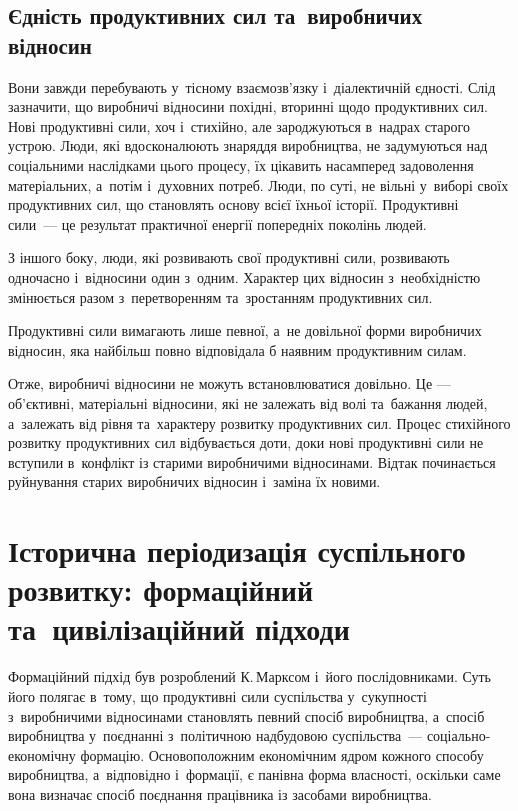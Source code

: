 \documentclass[a5paper,oneside,DIV=12,12pt,headings=small]{scrartcl}
\begin{document}
		\subsection{Єдність продуктивних сил та~виробничих відносин}
			Вони завжди перебувають у~тісному взаємозв'язку і~діалектичній єдності. Слід зазначити, що виробничі відносини похідні, вторинні щодо продуктивних сил. Нові продуктивні сили, хоч і~стихійно, але зароджуються в~надрах старого устрою. Люди, які вдосконалюють знаряддя виробництва, не задумуються над соціальними наслідками цього процесу, їх цікавить насамперед задоволення матеріальних, а~потім і~духовних потреб. Люди, по суті, не вільні у~виборі своїх продуктивних сил, що становлять основу всієї їхньої історії. Продуктивні сили~— це результат практичної енергії попередніх поколінь людей.

			З іншого боку, люди, які розвивають свої продуктивні сили, розвивають одночасно і~відносини один з~одним. Характер цих відносин з~необхідністю змінюється разом з~перетворенням та~зростанням продуктивних сил.

			Продуктивні сили вимагають лише певної, а~не довільної форми виробничих відносин, яка найбільш повно відповідала б наявним продуктивним силам.

			Отже, виробничі відносини не можуть встановлюватися довільно. Це — об'\-єктивні, матеріальні відносини, які не залежать від волі та~бажання людей, а~залежать від рівня та~характеру розвитку продуктивних сил. Процес стихійного розвитку продуктивних сил відбувається доти, доки нові продуктивні сили не вступили в~конфлікт із старими виробничими відносинами. Відтак починається руйнування старих виробничих відносин і~заміна їх новими.

	\section{Історична періодизація суспільного розвитку: формаційний та~цивілізаційний підходи}
		Формаційний підхід був розроблений К.\,Марксом і~його послідовниками. Суть його полягає в~тому, що продуктивні сили суспільства у~сукупності з~виробничими відносинами становлять певний спосіб виробництва, а~спосіб виробництва у~поєднанні з~політичною надбудовою суспільства~— соціально-економічну формацію. Основоположним економічним ядром кожного способу виробництва, а~відповідно і~формації, є панівна форма власності, оскільки саме вона визначає спосіб поєднання працівника із засобами виробництва.
\end{document}
